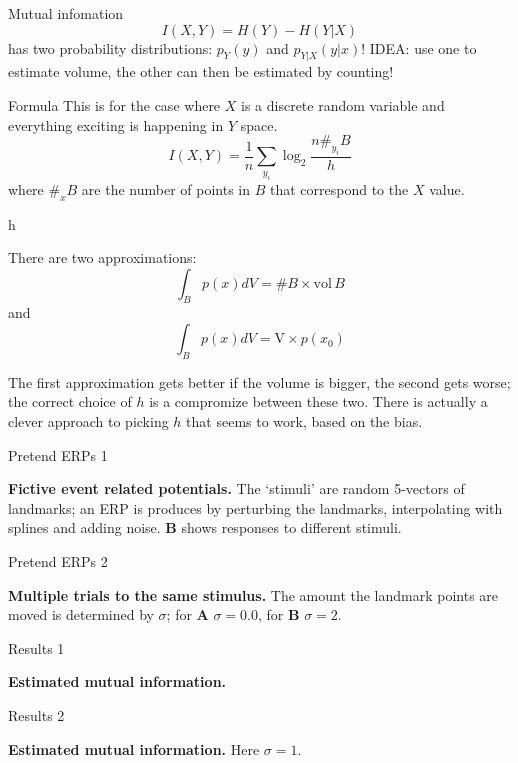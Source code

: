 \documentclass{beamer}
\begin{document}
\begin{frame}{Mutual infomation}
$$I(X,Y)=H(Y)-H(Y|X)$$ has two probability distributions: $p_Y(y)$ and
  $p_{Y|X}(y|x)$! IDEA: use one to estimate volume, the other can then
  be estimated by counting!
\end{frame}

\begin{frame}{Formula}
This is for the case where $X$ is a discrete random variable and
everything exciting is happening in $Y$ space.
$$I(X,Y)=\frac{1}{n}\sum_{y_i}\log_2{\frac{n\#_{y_i}B}{h}}$$
where $\#_{x}B$ are the number of points in $B$ that correspond to the $X$ value.
\end{frame}


\begin{frame}{h}

There are two approximations:
$$\int_B p(x)dV = \# B\times \mbox{vol}\,B$$
and
$$\int_B p(x)dV = \mbox{V}\times p(x_0)$$ 

The first approximation gets better if the volume is bigger, the
second gets worse; the correct choice of $h$ is a compromize between
these two. There is actually a clever approach to picking $h$ that
seems to work, based on the bias.
\end{frame}


\begin{frame}{Pretend ERPs 1}
\color{reddish}
\begin{center}

\end{center}
\color{black} \textbf{Fictive event related potentials.} The
\lq{}stimuli\rq{} are random 5-vectors of landmarks; an ERP is
produces by perturbing the landmarks, interpolating with splines and
adding noise. \textbf{B} shows responses to different stimuli.
\color{black}
\end{frame}


\begin{frame}{Pretend ERPs 2}
\color{reddish}
\begin{center}

\end{center}
\color{black} \textbf{Multiple trials to the same stimulus.} The
amount the landmark points are moved is determined by $\sigma$; for
\textbf{A} $\sigma=0.0$, for \textbf{B} $\sigma=2$.  \color{black}
\end{frame}



\begin{frame}{Results 1}
\color{reddish}
\begin{center}

\color{black} \textbf{Estimated mutual information.} \color{black}
\end{center}
\end{frame}


\begin{frame}{Results 2}
\color{reddish}
\begin{center}
  
\color{black} \textbf{Estimated mutual information.} Here $\sigma=1$. \color{black}
\end{center}
\end{frame}
\end{document}
